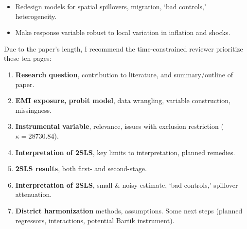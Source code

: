 \documentclass[letterpaper,12pt]{article}
\begin{document}
\begin{enumerate}
\begin{itemize}
\vspace{-1mm}

\item Redesign models for spatial spillovers, migration, `bad controls,' heterogeneity. 

\vspace{-1mm}

\item Make response variable robust to local variation in inflation and shocks.
\end{itemize}
\vspace{1mm}


\end{enumerate}


\noindent Due to the paper's length, I recommend the time-constrained reviewer prioritize these ten pages: 

\begin{enumerate}
\item[6:] \textbf{Research question}, contribution to literature, and summary/outline of paper.
\item[10-11:] \textbf{EMI exposure, probit model}, data wrangling, variable construction, missingness.
\item[23:] \textbf{Instrumental variable}, relevance, issues with exclusion restriction ($\kappa=28730.84$).
\item[25:] \textbf{Interpretation of 2SLS}, key limits to interpretation, planned remedies.
\item[26-27:] \textbf{2SLS results}, both first- and second-stage.
\item[28:] \textbf{Interpretation of 2SLS}, small \& noisy estimate, `bad controls,' spillover attenuation. 
\item[32-33:] \textbf{District harmonization}  methods, assumptions. Some next steps (planned regressors, interactions, potential Bartik instrument).

\end{enumerate}
\end{document}
